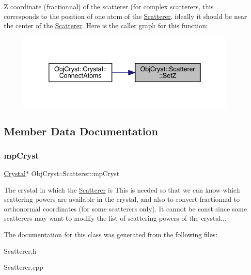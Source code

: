 Z coordinate (fractionnal) of the scatterer (for complex scatterers, this corresponds to the position of one atom of the \mbox{\hyperlink{class_obj_cryst_1_1_scatterer}{Scatterer}}, ideally it should be near the center of the \mbox{\hyperlink{class_obj_cryst_1_1_scatterer}{Scatterer}}. Here is the caller graph for this function\+:
\nopagebreak
\begin{figure}[H]
\begin{center}
\leavevmode
\includegraphics[width=314pt]{class_obj_cryst_1_1_scatterer_a4b37d00a337253b810700e068046c6ec_icgraph}
\end{center}
\end{figure}


\subsection{Member Data Documentation}
\mbox{\label{class_obj_cryst_1_1_scatterer_a359e6115a710c44bf340f439a17cb073}} 
\subsubsection{\texorpdfstring{mpCryst}{mpCryst}}
{\footnotesize\ttfamily \mbox{\hyperlink{class_obj_cryst_1_1_crystal}{Crystal}}$\ast$ Obj\+Cryst\+::\+Scatterer\+::mp\+Cryst\hspace{0.3cm}{\ttfamily [protected]}}

The crystal in which the \mbox{\hyperlink{class_obj_cryst_1_1_scatterer}{Scatterer}} is This is needed so that we can know which scattering powers are available in the crystal, and also to convert fractionnal to orthonormal coordinates (for some scatterers only). It cannot be const since some scatterers may want to modify the list of scattering powers of the crystal... 

The documentation for this class was generated from the following files\+:\begin{DoxyCompactItemize}
\item 
Scatterer.\+h\item 
Scatterer.\+cpp\end{DoxyCompactItemize}
